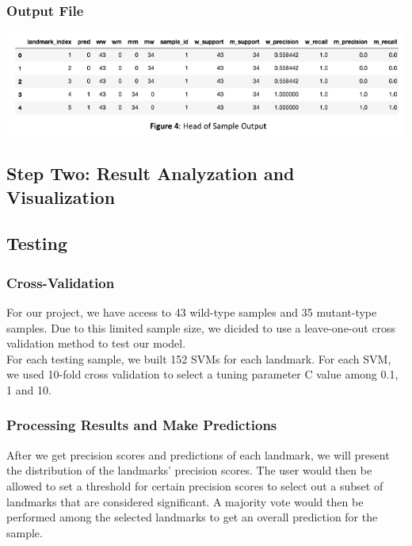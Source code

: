 \documentclass[10pt,letterpaper]{article}
\begin{document}
\subsubsection{Output File}\label{output-file}

\includegraphics{zebrafish_paper_files/figure-latex/unnamed-chunk-5-1.pdf}

\subsection{Step Two: Result Analyzation and
Visualization}\label{step-two-result-analyzation-and-visualization}

\subsection{Testing}\label{testing}

\subsubsection{Cross-Validation}\label{cross-validation}

For our project, we have access to 43 wild-type samples and 35
mutant-type samples. Due to this limited sample size, we dicided to use
a leave-one-out cross validation method to test our model.\\
For each testing sample, we built 152 SVMs for each landmark. For each
SVM, we used 10-fold cross validation to select a tuning parameter C
value among 0.1, 1 and 10.

\subsubsection{Processing Results and Make
Predictions}\label{processing-results-and-make-predictions}

After we get precision scores and predictions of each landmark, we will
present the distribution of the landmarks' precision scores. The user
would then be allowed to set a threshold for certain precision scores to
select out a subset of landmarks that are considered significant. A
majority vote would then be performed among the selected landmarks to
get an overall prediction for the sample.
\end{document}
